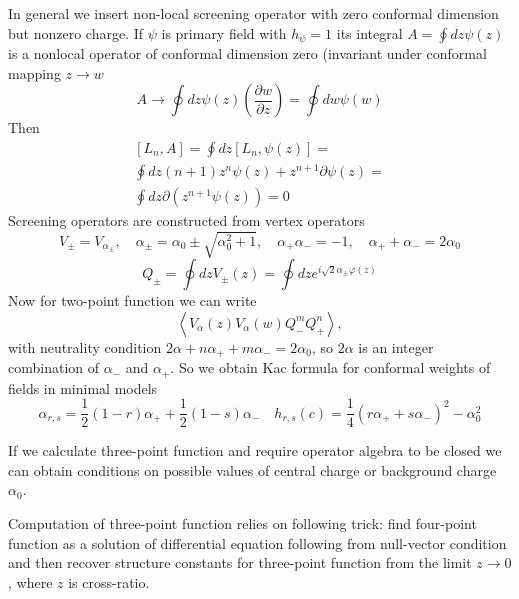 \documentclass[12pt]{article}
\begin{document}
In general we insert non-local screening operator with zero conformal dimension but nonzero charge.
If $\psi$ is primary field with $h_{\psi}=1$ its integral $  A=\oint dz \psi(z) $ is a nonlocal
operator of conformal dimension zero (invariant under conformal mapping $z\to w$ 
\begin{equation}
  \label{eq:50}
  A\to \oint dz \psi(z) \left(\frac{\partial w}{\partial z}\right)=\oint dw \psi(w)
\end{equation}
Then
\begin{multline}
  \label{eq:51}
  [L_{n},A]=\oint dz [L_{n},\psi(z)]=\\\oint dz  (n+1) z^{n}\psi(z)+z^{n+1}\partial \psi(z)=\\
  \oint dz \partial (z^{n+1}\psi (z))=0
\end{multline}
Screening operators are constructed from vertex operators
\begin{equation}
  \label{eq:52}
  V_{\pm}=V_{\alpha_{\pm}}, \quad \alpha_{\pm}=\alpha_{0}\pm \sqrt{\alpha_{0}^{2}+1}, \quad
  \alpha_{+}\alpha_{-}=-1,\quad \alpha_{+}+\alpha_{-}=2\alpha_{0}
\end{equation}
\begin{equation}
  \label{eq:53}
  Q_{\pm}=\oint dz V_{\pm}(z)=\oint dz e^{i\sqrt{2}\alpha_{\pm}\varphi(z)}
\end{equation}
Now for two-point function we can write
\begin{equation}
  \label{eq:54}
  \left<V_{\alpha}(z)V_{\alpha}(w)Q_{-}^{m}Q_{+}^{n}\right>,
\end{equation}
with neutrality condition $2\alpha+n\alpha_{+}+m\alpha_{-}=2\alpha_{0}$,  so $2\alpha$ is an integer
combination of $\alpha_{-}$ and $\alpha_{+}$.
So we obtain Kac formula for conformal weights of fields in minimal models
\begin{equation}
  \label{eq:55}
  \alpha_{r,s}=\frac{1}{2}(1-r)\alpha_{+}+\frac{1}{2}(1-s)\alpha_{-}\quad 
  h_{r,s}(c)=\frac{1}{4}(r\alpha_{+}+s\alpha_{-})^{2}-\alpha_{0}^{2}
\end{equation}

If we calculate three-point function and require operator algebra to be closed we can obtain
conditions on possible values of central charge or background charge $\alpha_{0}$. 

Computation of three-point function relies on following trick: find four-point function as a
solution of differential equation following from null-vector condition and then recover structure
constants for three-point function from the limit $z\to 0$, where $z$ is cross-ratio. 
\end{document}
